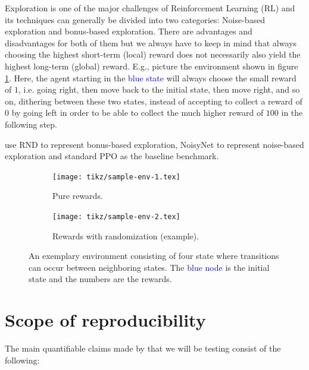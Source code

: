 \documentclass[10pt]{article} %
\begin{document}
\noindent Exploration is one of the major challenges of Reinforcement Learning (RL) and its techniques can generally be divided into two categories: Noise-based exploration and bonus-based exploration. There are advantages and disadvantages for both of them but we always have to keep in mind that always choosing the highest short-term (local) reward does not necessarily also yield the highest long-term (global) reward. E.g., picture the environment shown in figure \ref{fig:sample-env-1}. Here, the agent starting in the \textcolor{blue}{blue state} will always choose the small reward of $1$, i.e. going right, then move back to the initial state, then move right, and so on, dithering between these two states, instead of accepting to collect a reward of $0$ by going left in order to be able to collect the much higher reward of $100$ in the following step.

\noindent \cite{rle-paper} use RND to represent bonus-based exploration, NoisyNet to represent noise-based exploration and standard PPO as the baseline benchmark.

\begin{figure}[h!]
  \centering
  \begin{subfigure}[b]{0.45\textwidth}
    \centering
    \texttt{[image: tikz/sample-env-1.tex]}
    \caption{Pure rewards.}
    \label{fig:sample-env-1}
  \end{subfigure}
  \hfill
  \begin{subfigure}[b]{0.45\textwidth}
    \centering
    \texttt{[image: tikz/sample-env-2.tex]}
    \caption{Rewards with randomization (example).}
    \label{fig:sample-env-2}
  \end{subfigure}
  
  \caption{An exemplary environment consisting of four state where transitions can occur between neighboring states. The \textcolor{blue}{blue node} is the initial state and the numbers are the rewards.}
  \label{fig:sample-env}
\end{figure}

\newpage
\section{Scope of reproducibility}
\label{sec:claims}

The main quantifiable claims made by \cite{rle-paper} that we will be testing consist of the following:
\end{document}
